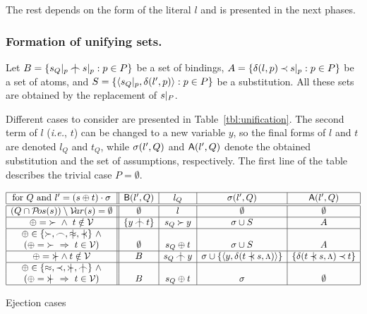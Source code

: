 The rest depends on the form of the literal $l$ and is presented in the next
phases. 
%
\subsubsection{Formation of unifying sets.}
%
Let \(B =\{\subterm {s_Q} p\notInt \subterm sp: p\in P\}\) be a set of
bindings, \(A =\{\delta(l,p)\mathbin{\prec} s|_{p}: p\in P\}\) be a set of atoms,
and \(S =\{\langle s_Q|_{p} ,\delta(l',p)\rangle: p\in P\}\) be a substitution. All
these sets are obtained by the replacement of \(s|_{P}\).

Different cases to consider are presented in Table~\ref {tbl:unification}.
The second term of $l$ ({\it i.e.}, $t$) can be changed to a new variable
$y$, so the final forms of $l$ and $t$ are denoted $l_Q$ and $t_Q$, while
\(\sigma(l',Q)\) and \({\sf A}(l',Q)\) denote the obtained substitution and the set
of assumptions, respectively.  The first line of the table describes the
trivial case \(P=\emptyset\).

\begin{table}[hbt]
\begin{center}
\(
\begin{array}{|c||c|c|c|c|}
\hline
   \mbox{for }Q\mbox{ and }l'=(s\oplus t)\cdot \sigma & \Bin(l',Q) & l_Q & \Sub(l',Q) & \At(l',Q) \\
\hline\hline
 (Q\cap\Pos s)\setminus \Var s=\es & \es & l & \es & \es \\ 
\hline
 \oplus=\Cont\ \land\ t\notin \Vars & \{y\notInt t\} & s_Q\Cont y & \sigma\cup S & A \\
\hline
 \oplus\in\{\Cont,\Int,\notEq,\notIncl\}\ \land & & & & \\
 (\oplus=\Cont\ \then\ t\in \Vars) & \es & s_Q\oplus t & \sigma\cup S & A \\
\hline
 \oplus=\notCont\land t\notin \Vars & B & s_Q\notInt y & \sigma\cup\{\<y,\dt {t\notIncl s}{\Top}\>\} & \{\dt {t\notIncl s}{\Top}\Incl t\} \\
\hline
  \oplus\in\{\Eq,\Incl,\notCont,\notInt\}\ \land & & & & \\
  ( \oplus=\notCont\ \then\ t\in \Vars) & B & s_Q\oplus t & \sigma & \es \\
\hline
\end{array}
\)
\end{center}
\caption{Ejection cases} \label{tbl:unification}
\end{table}
%
